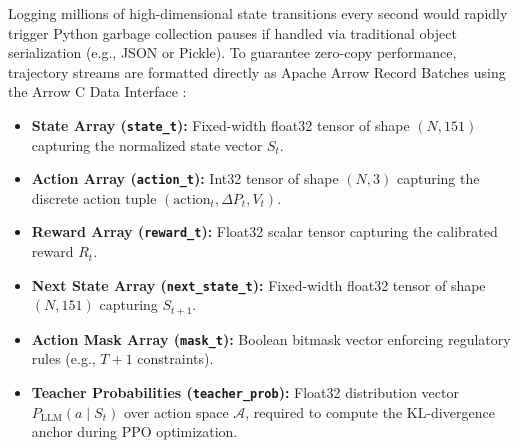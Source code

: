 Logging millions of high-dimensional state transitions every second would rapidly trigger Python garbage collection pauses if handled via traditional object serialization (e.g., JSON or Pickle). To guarantee zero-copy performance, trajectory streams are formatted directly as Apache Arrow Record Batches using the Arrow C Data Interface \cite{apache_arrow_c_data}:
\begin{itemize}
    \item \textbf{State Array (\texttt{state\_t}):} Fixed-width float32 tensor of shape $(N, 151)$ capturing the normalized state vector $S_t$.
    \item \textbf{Action Array (\texttt{action\_t}):} Int32 tensor of shape $(N, 3)$ capturing the discrete action tuple $(\text{action}_t, \Delta P_t, V_t)$.
    \item \textbf{Reward Array (\texttt{reward\_t}):} Float32 scalar tensor capturing the calibrated reward $R_t$.
    \item \textbf{Next State Array (\texttt{next\_state\_t}):} Fixed-width float32 tensor of shape $(N, 151)$ capturing $S_{t+1}$.
    \item \textbf{Action Mask Array (\texttt{mask\_t}):} Boolean bitmask vector enforcing regulatory rules (e.g., $T+1$ constraints).
    \item \textbf{Teacher Probabilities (\texttt{teacher\_prob}):} Float32 distribution vector $P_{\text{LLM}}(a \mid S_t)$ over action space $\mathcal{A}$, required to compute the KL-divergence anchor during PPO optimization.
\end{itemize}

